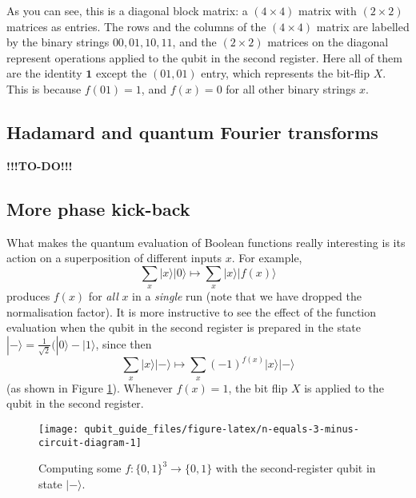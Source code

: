 \documentclass[fleqn]{article}
\begin{document}
As you can see, this is a diagonal block matrix: a \((4\times 4)\) matrix with \((2\times 2)\) matrices as entries.
The rows and the columns of the \((4\times 4)\) matrix are labelled by the binary strings \(00, 01, 10, 11\), and the \((2\times 2)\) matrices on the diagonal represent operations applied to the qubit in the second register.
Here all of them are the identity \(\mathbf{1}\) except the \((01, 01)\) entry, which represents the bit-flip \(X\).
This is because \(f(01)=1\), and \(f(x)=0\) for all other binary strings \(x\).

\hypertarget{hadamard-and-quantum-fourier-transforms}{%
\subsection{Hadamard and quantum Fourier transforms}\label{hadamard-and-quantum-fourier-transforms}}

\textbf{!!!TO-DO!!!}

\hypertarget{more-phase-kick-back}{%
\subsection{More phase kick-back}\label{more-phase-kick-back}}

What makes the quantum evaluation of Boolean functions really interesting is its action on a superposition of different inputs \(x\).
For example,
\[
  \sum_{x}|x\rangle|0\rangle
  \longmapsto
  \sum_{x}|x\rangle|f(x)\rangle
\]
produces \(f(x)\) for \emph{all} \(x\) in a \emph{single} run (note that we have dropped the normalisation factor).
It is more instructive to see the effect of the function evaluation when the qubit in the second register is prepared in the state \(|-\rangle = \frac{1}{\sqrt 2}(|0\rangle - |1\rangle\), since then
\[
  \sum_x|x\rangle|-\rangle
  \longmapsto
  \sum_x (-1)^{f(x)}|x\rangle|-\rangle
\]
(as shown in Figure \ref{fig:n-equals-3-minus-circuit-diagram}).
Whenever \(f(x)=1\), the bit flip \(X\) is applied to the qubit in the second register.



\begin{figure}[H]

{\centering \texttt{[image: qubit\_guide\_files/figure-latex/n-equals-3-minus-circuit-diagram-1]} 

}

\caption{Computing some \(f\colon\{0,1\}^3\to\{0,1\}\) with the second-register qubit in state \(|-\rangle\).}\label{fig:n-equals-3-minus-circuit-diagram}
\end{figure}
\end{document}
